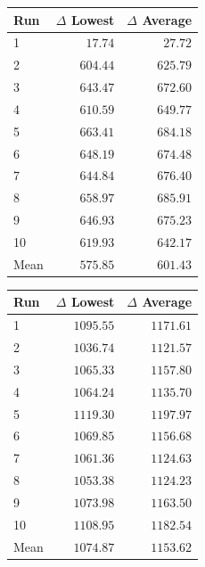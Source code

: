 \begin{table}[H]
    \centering
    \begin{minipage}[t]{0.48\textwidth}
        \centering
        \label{tab:gain-uniform-regular}
        \small
        \setlength{\tabcolsep}{4pt}
        \begin{tabular}{lrr}
            \toprule
            \textbf{Run} & \textbf{$\Delta$ Lowest} & \textbf{$\Delta$ Average} \\
            \midrule
            1 & $17.74$ & $27.72$ \\
            2 & $604.44$ & $625.79$ \\
            3 & $643.47$ & $672.60$ \\
            4 & $610.59$ & $649.77$ \\
            5 & $663.41$ & $684.18$ \\
            6 & $648.19$ & $674.48$ \\
            7 & $644.84$ & $676.40$ \\
            8 & $658.97$ & $685.91$ \\
            9 & $646.93$ & $675.23$ \\
            10 & $619.93$ & $642.17$ \\
            \midrule
            Mean & $575.85$ & $601.43$ \\
            \bottomrule
        \end{tabular}
    \end{minipage}
    \hfill
    \begin{minipage}[t]{0.48\textwidth}
        \centering
        \label{tab:gain-normal-regular}
        \small
        \setlength{\tabcolsep}{4pt}
        \begin{tabular}{lrr}
            \toprule
            \textbf{Run} & \textbf{$\Delta$ Lowest} & \textbf{$\Delta$ Average} \\
            \midrule
            1 & $1095.55$ & $1171.61$ \\
            2 & $1036.74$ & $1121.57$ \\
            3 & $1065.33$ & $1157.80$ \\
            4 & $1064.24$ & $1135.70$ \\
            5 & $1119.30$ & $1197.97$ \\
            6 & $1069.85$ & $1156.68$ \\
            7 & $1061.36$ & $1124.63$ \\
            8 & $1053.38$ & $1124.23$ \\
            9 & $1073.98$ & $1163.50$ \\
            10 & $1108.95$ & $1182.54$ \\
            \midrule
            Mean & $1074.87$ & $1153.62$ \\
            \bottomrule
        \end{tabular}
    \end{minipage}
\end{table}

